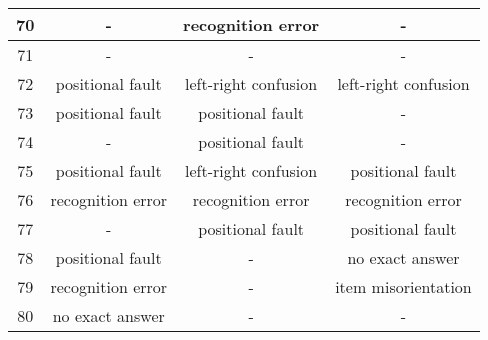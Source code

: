\begin{table*}[ht]
{\begin{tabular}{|c|c|c|c|}
        70              & -                                 & recognition error    & -                                 \\ \hline
        71              & -                                 & -                    & -                                 \\ \hline
        72              & positional fault                  & left-right confusion & left-right confusion              \\ \hline
        73              & positional fault                  & positional fault    & -                                 \\ \hline
        74              & -                                 & positional fault    & -                                 \\ \hline
        75              & positional fault                  & left-right confusion & positional fault                 \\ \hline
        76              & recognition error                 & recognition error    & recognition error                 \\ \hline
        77              & -                                 & positional fault    & positional fault                 \\ \hline
        78              & positional fault                  & -                    & no exact answer                   \\ \hline
        79              & recognition error                 & -                    & item misorientation               \\ \hline
        80              & no exact answer                   & -                    & -                                 \\ \hline
        \end{tabular}%
        }
    \end{table*}